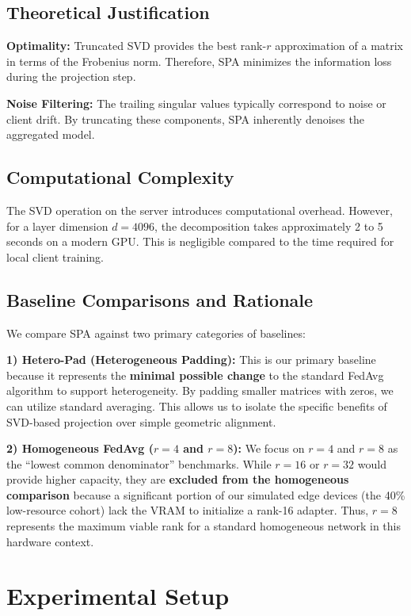 \documentclass[conference]{IEEEtran}
\begin{document}
\subsection{Theoretical Justification}

\textbf{Optimality:} Truncated SVD provides the best rank-$r$ approximation of a matrix in terms of the Frobenius norm. Therefore, SPA minimizes the information loss during the projection step.

\textbf{Noise Filtering:} The trailing singular values typically correspond to noise or client drift. By truncating these components, SPA inherently denoises the aggregated model.

\subsection{Computational Complexity}
The SVD operation on the server introduces computational overhead. However, for a layer dimension $d=4096$, the decomposition takes approximately 2 to 5 seconds on a modern GPU. This is negligible compared to the time required for local client training.

\subsection{Baseline Comparisons and Rationale}
We compare SPA against two primary categories of baselines:

\textbf{1) Hetero-Pad (Heterogeneous Padding):} This is our primary baseline because it represents the \textbf{minimal possible change} to the standard FedAvg algorithm to support heterogeneity. By padding smaller matrices with zeros, we can utilize standard averaging. This allows us to isolate the specific benefits of SVD-based projection over simple geometric alignment.

\textbf{2) Homogeneous FedAvg ($r=4$ and $r=8$):} We focus on $r=4$ and $r=8$ as the ``lowest common denominator'' benchmarks. While $r=16$ or $r=32$ would provide higher capacity, they are \textbf{excluded from the homogeneous comparison} because a significant portion of our simulated edge devices (the 40\% low-resource cohort) lack the VRAM to initialize a rank-16 adapter. Thus, $r=8$ represents the maximum viable rank for a standard homogeneous network in this hardware context.

\section{Experimental Setup}
\label{sec:experiments}
\end{document}
